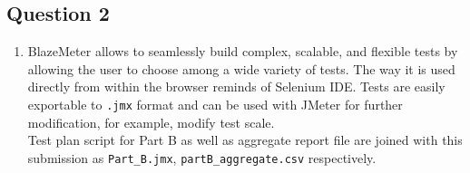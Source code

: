 \newpage
\subsection*{Question 2}

\noindent 
\begin{enumerate}[label={\alph*)}]
    \item BlazeMeter allows to seamlessly build complex, scalable, and flexible tests by allowing the user to choose among a wide variety of tests. The way it is used directly from within the browser reminds of Selenium IDE. Tests are easily exportable to \verb|.jmx| format and can be used with JMeter for further modification, for example, modify test scale. \\ Test plan script for Part B as well as aggregate report file are joined with this submission as \verb|Part_B.jmx|, \verb|partB_aggregate.csv| respectively.
\end{enumerate}